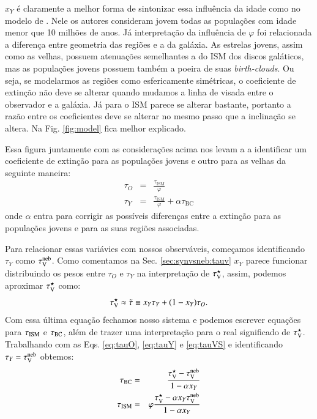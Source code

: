 $x_Y$ é claramente a melhor forma de sintonizar essa influência da idade como no modelo de
\citet{Charlot.Fall.2000a}. Nele os autores consideram jovem todas as populações com idade menor que
10 milhões de anos. Já interpretação da influência de $\varphi$ foi relacionada a diferença entre
geometria das regiões \Hii e a da galáxia. As estrelas jovens, assim como as velhas, possuem
atenuações semelhantes a do ISM dos discos galáticos, mas as populações jovens possuem também a
poeira de suas {\em birth-clouds}. Ou seja, se modelarmos as regiões \Hii como esfericamente simétricas, o
coeficiente de extinção não deve se alterar quando mudamos a linha de visada entre o observador e a
galáxia. Já para o ISM parece se alterar bastante, portanto a razão entre os coeficientes deve se
alterar no mesmo passo que a inclinação se altera. Na Fig. \ref{fig:model}  fica melhor explicado.

Essa figura juntamente com as considerações acima nos levam a a identificar um coeficiente de
extinção para as populações jovens e outro para as velhas da seguinte maneira:
\begin{eqnarray}
	\tau_O &=& \frac{\tau_{\mathrm{ISM}}}{\varphi} \\
	\label{eq:tauO}
	\tau_Y &=& \frac{\tau_{\mathrm{ISM}}}{\varphi} + \alpha\tau_{\mathrm{BC}}
	\label{eq:tauY} 
\end{eqnarray}
\noindent onde $\alpha$ entra para corrigir as possíveis diferenças entre a extinção para as
populações jovens e para as suas regiões \Hii associadas.

Para relacionar essas variávies com nossos observáveis, começamos identificando $\tau_Y$ como
$\tau_{\mathrm{V}}^{\mathrm{neb}}$. Como comentamos na Sec. \ref{sec:synvsneb:tauv} $x_Y$ parece funcionar distribuindo os
pesos entre $\tau_O$ e $\tau_Y$ na interpretação de $\tau_{\mathrm{V}}^\star$, assim, podemos aproximar $\tau_{\mathrm{V}}^\star$
como:
\begin{equation}
	\tau_{\mathrm{V}}^\star \approx \tilde{\tau} \equiv x_Y \tau_Y + (1 - x_Y) \tau_O.
	\label{eq:tauVS}
\end{equation}
Com essa última equação fechamos nosso sistema e podemos escrever equações para $\tau_{\mathrm{ISM}}$ e
$\tau_{\mathrm{BC}}$, além de trazer uma interpretação para o real significado de $\tau_{\mathrm{V}}^\star$. Trabalhando com as
Eqs. \ref{eq:tauO}, \ref{eq:tauY} e \ref{eq:tauVS} e identificando $\tau_Y = \tau_{\mathrm{V}}^{\mathrm{neb}}$ obtemos:  
\begin{eqnarray}
	\tau_{\mathrm{BC}} &=& \frac{\tau_{\mathrm{V}}^\star - \tau_{\mathrm{V}}^{\mathrm{neb}}}{1 - \alpha x_Y} \\
	\label{eq:tauBC}
	\tau_{\mathrm{ISM}} &=& \varphi\frac{\tau_{\mathrm{V}}^\star - \alpha x_Y \tau_{\mathrm{V}}^{\mathrm{neb}}}{1 - \alpha x_Y}  
	\label{eq:tauISM}
\end{eqnarray}

